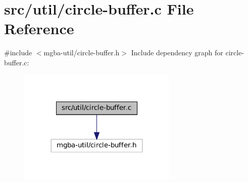 \hypertarget{circle-buffer_8c}{}\section{src/util/circle-\/buffer.c File Reference}
\label{circle-buffer_8c}
{\ttfamily \#include $<$mgba-\/util/circle-\/buffer.\+h$>$}\newline
Include dependency graph for circle-\/buffer.c\+:
\nopagebreak
\begin{figure}[H]
\begin{center}
\leavevmode
\includegraphics[width=215pt]{circle-buffer_8c__incl}
\end{center}
\end{figure}
